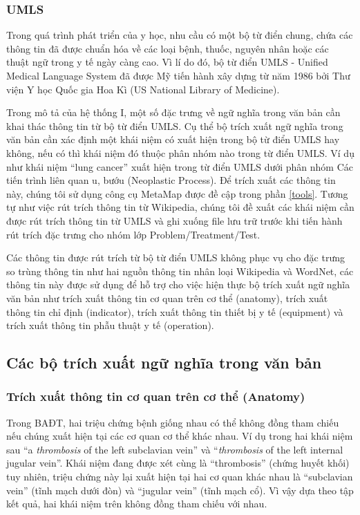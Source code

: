 \subsubsection*{UMLS}
Trong quá trình phát triển của y học, nhu cầu có một bộ từ điển chung, chứa các thông tin đã được chuẩn hóa về các loại bệnh, thuốc, nguyên nhân hoặc các thuật ngữ trong y tế ngày càng cao. Vì lí do đó, bộ từ điển UMLS - Unified Medical Language System đã được Mỹ tiến hành xây dựng từ năm 1986 bởi Thư viện Y học Quốc gia Hoa Kì (US National Library of Medicine).

Trong mô tả của hệ thống I, một số đặc trưng về ngữ nghĩa trong văn bản cần khai thác thông tin từ bộ từ điển UMLS. Cụ thể bộ trích xuất ngữ nghĩa trong văn bản cần xác định một khái niệm có xuất hiện trong bộ từ điển UMLS hay không, nếu có thì khái niệm đó thuộc phân nhóm nào trong từ điển UMLS. Ví dụ như khái niệm ``lung cancer'' xuất hiện trong từ điển UMLS dưới phân nhóm Các tiến trình liên quan u, bướu (Neoplastic Process). Để trích xuất các thông tin này, chúng tôi sử dụng công cụ MetaMap được đề cập trong phần \ref{tools}. Tương tự như việc rút trích thông tin từ Wikipedia, chúng tôi đề xuất các khái niệm cần được rút trích thông tin từ UMLS và ghi xuống file lưu trữ trước khi tiến hành rút trích đặc trưng cho nhóm lớp Problem/Treatment/Test.

Các thông tin được rút trích từ bộ từ điển UMLS không phục vụ cho đặc trưng so trùng thông tin như hai nguồn thông tin nhân loại Wikipedia và WordNet, các thông tin này được sử dụng để hỗ trợ cho việc hiện thực bộ trích xuất ngữ nghĩa văn bản như trích xuất thông tin cơ quan trên cơ thể (anatomy), trích xuất thông tin chỉ định (indicator), trích xuất thông tin thiết bị y tế (equipment) và trích xuất thông tin phẫu thuật y tế (operation).

\subsection*{Các bộ trích xuất ngữ nghĩa trong văn bản}

\subsubsection*{Trích xuất thông tin cơ quan trên cơ thể (Anatomy)}
Trong BAĐT, hai triệu chứng bệnh giống nhau có thể không đồng tham chiếu nếu chúng xuất hiện tại các cơ quan cơ thể khác nhau. Ví dụ trong hai khái niệm sau ``a \textit{thrombosis} of the left subclavian vein'' và ``\textit{thrombosis} of the left internal jugular vein''. Khái niệm đang được xét cùng là ``thrombosis'' (chứng huyết khối) tuy nhiên, triệu chứng này lại xuất hiện tại hai cơ quan khác nhau là ``subclavian vein'' (tĩnh mạch dưới đòn) và ``jugular vein'' (tĩnh mạch cổ). Vì vậy dựa theo tập kết quả, hai khái niệm trên không đồng tham chiếu với nhau.

